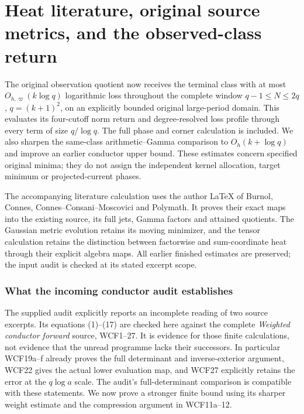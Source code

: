 
\clearpage\begingroup
\providecommand{\C}{\mathbb C}\providecommand{\R}{\mathbb R}
\providecommand{\norm}[1]{\left\lVert#1\right\rVert}
\providecommand{\rank}{\operatorname{rank}}
\newtheorem{hzoctheorem}{Theorem}
\newtheorem{hzocproposition}[hzoctheorem]{Proposition}
\newtheorem{hzoclemma}[hzoctheorem]{Lemma}
\newtheorem{hzoccorollary}[hzoctheorem]{Corollary}
\newtheorem{hzocremark}[hzoctheorem]{Remark}

\part*{Heat literature, original source metrics, and the observed-class return}
The original observation quotient now receives the terminal class with
at most $O_{h,\varpi}(k\log q)$ logarithmic loss throughout the complete
window $q-1\le N\le2q$, $q=(k+1)^2$, on an explicitly bounded original
large-period domain. This evaluates its four-cutoff norm return and
degree-resolved loss profile through every term of size $q/\log q$.
The full phase and corner calculation is included. We also sharpen the
same-class arithmetic--Gamma comparison to $O_h(k+\log q)$ and improve
an earlier conductor upper bound. These estimates concern specified
original minima; they do not assign the independent kernel allocation,
target minimum or projected-current phases.

The accompanying literature calculation uses the author LaTeX of
Burnol, Connes, Connes--Consani--Moscovici and Polymath. It proves their
exact maps into the existing source, its full jets, Gamma factors and
attained quotients. The Gaussian metric evolution retains its moving
minimizer, and the tensor calculation retains the distinction between
factorwise and sum-coordinate heat through their explicit algebra maps.
All earlier finished estimates are preserved; the input audit is
checked at its stated excerpt scope.


\section{What the incoming conductor audit establishes}
\label{hzoc:sec:audit}
The supplied audit explicitly reports an incomplete reading of two source
excerpts. Its equations (1)--(17) are checked here against the complete
\emph{Weighted conductor forward} source, WCF1--27. It is evidence for
those finite calculations, not evidence that the unread programme lacks
their successors. In particular WCF19a--f already proves the full
determinant and inverse-exterior argument, WCF22 gives the actual lower
evaluation map, and WCF27 explicitly retains the error at the
$q\log a$ scale. The audit's full-determinant comparison is compatible
with these statements. We now prove a stronger finite bound using its
sharper weight estimate and the compression argument in WCF11a--12.

